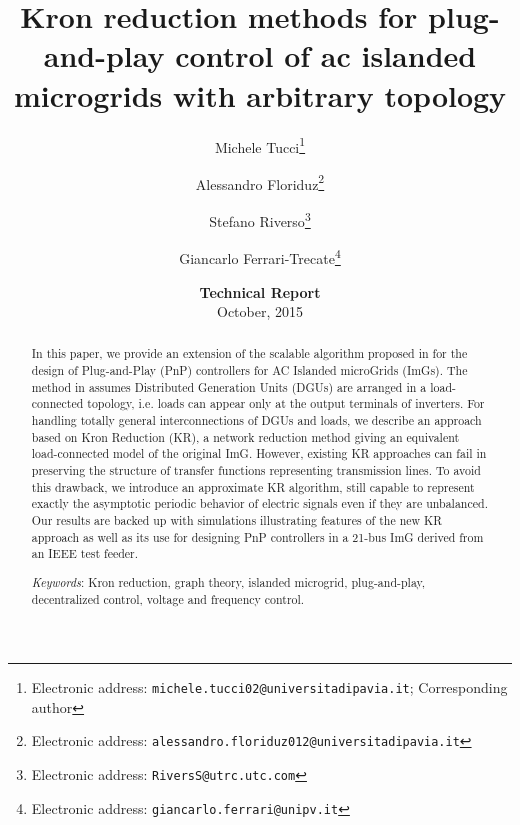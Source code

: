 \documentclass[a4paper]{article}
\theoremstyle{plain}
\begin{document}
\title{\LARGE \bf Kron reduction methods for plug-and-play control of ac islanded microgrids with arbitrary topology}

\author[1]{Michele Tucci\thanks{Electronic address:
         \texttt{michele.tucci02@universitadipavia.it}; Corresponding author}}
\author[1]{Alessandro Floriduz\thanks{Electronic address: \texttt{alessandro.floriduz012@universitadipavia.it}} }       
 \author[2]{Stefano Riverso\thanks{Electronic address: \texttt{RiversS@utrc.utc.com}}} 
\author[1]{Giancarlo Ferrari-Trecate\thanks{Electronic address: \texttt{giancarlo.ferrari@unipv.it}} }



     
\date{\textbf{Technical Report}\\ October, 2015}

     \maketitle



     \begin{abstract}
In this paper, we provide an extension of the scalable algorithm proposed in \cite{riverso2015plug} for the design of Plug-and-Play (PnP) controllers for AC Islanded microGrids (ImGs). The method in \cite{riverso2015plug}
assumes Distributed Generation Units (DGUs) are arranged in a load-connected topology, i.e. loads can appear only at the output terminals of inverters. For handling totally general interconnections of DGUs and loads, we describe an approach based on Kron Reduction (KR), a network reduction method giving an equivalent load-connected model of the original ImG. However, existing KR approaches can fail in preserving the structure of transfer functions representing transmission lines. To avoid this drawback, we introduce an approximate KR algorithm, still capable to represent exactly the asymptotic periodic behavior of electric signals even if they are unbalanced. 
Our results are backed up with simulations illustrating features of the new KR approach as well as its use for designing PnP controllers in a 21-bus ImG derived from an IEEE test feeder.

       \emph{Keywords}: Kron reduction, graph theory, islanded microgrid, plug-and-play, decentralized control, voltage and frequency control.
     \end{abstract}
     
\end{document}
